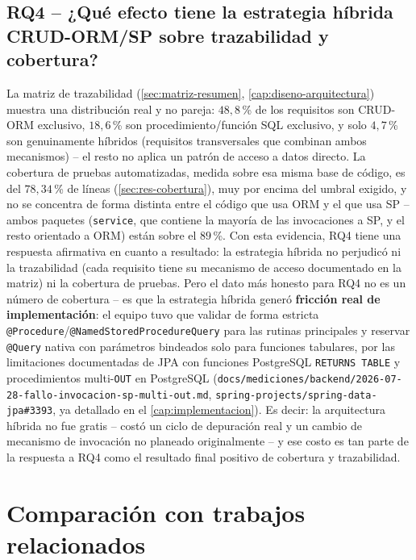 \subsection*{RQ4 -- ¿Qué efecto tiene la estrategia híbrida CRUD-ORM/SP sobre trazabilidad y cobertura?}

La matriz de trazabilidad (\autoref{sec:matriz-resumen},
\autoref{cap:diseno-arquitectura}) muestra una distribución real y no
pareja: $48{,}8$\,\% de los requisitos son CRUD-ORM exclusivo,
$18{,}6$\,\% son procedimiento/función SQL exclusivo, y solo
$4{,}7$\,\% son genuinamente híbridos (requisitos transversales que
combinan ambos mecanismos) -- el resto no aplica un patrón de acceso a
datos directo. La cobertura de pruebas automatizadas, medida sobre esa
misma base de código, es del $78{,}34$\,\% de líneas
(\autoref{sec:res-cobertura}), muy por encima del umbral exigido, y no
se concentra de forma distinta entre el código que usa ORM y el que usa
SP -- ambos paquetes (\texttt{service}, que contiene la mayoría de las
invocaciones a SP, y el resto orientado a ORM) están sobre el $89$\,\%.
Con esta evidencia, RQ4 tiene una respuesta afirmativa en cuanto a
resultado: la estrategia híbrida no perjudicó ni la trazabilidad (cada
requisito tiene su mecanismo de acceso documentado en la matriz) ni la
cobertura de pruebas. Pero el dato más honesto para RQ4 no es un número
de cobertura -- es que la estrategia híbrida generó \textbf{fricción real
de implementación}: el equipo tuvo que validar de forma estricta
\texttt{@Procedure}/\texttt{@NamedStoredProcedureQuery} para las rutinas
principales y reservar \texttt{@Query} nativa con parámetros bindeados
solo para funciones tabulares, por las limitaciones documentadas de JPA
con funciones PostgreSQL \texttt{RETURNS TABLE} y procedimientos
multi-\texttt{OUT} en PostgreSQL
(\texttt{docs/mediciones/backend/2026-07-28-fallo-invocacion-sp-multi-out.md},
\texttt{spring-projects/spring-data-jpa\#3393}, ya detallado en el
\autoref{cap:implementacion}). Es decir: la arquitectura híbrida no fue
gratis -- costó un ciclo de depuración real y un cambio de mecanismo de
invocación no planeado originalmente -- y ese costo es tan parte de la
respuesta a RQ4 como el resultado final positivo de cobertura y
trazabilidad.

\section{Comparación con trabajos relacionados}
\label{sec:disc-trabajos-relacionados}


